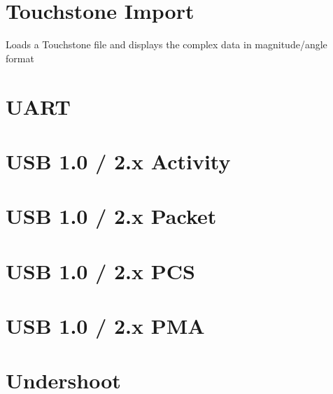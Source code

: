 \pagebreak
\section{Touchstone Import}

Loads a Touchstone file and displays the complex data in magnitude/angle format

\pagebreak
\section{UART}

\pagebreak
\section{USB 1.0 / 2.x Activity}

\pagebreak
\section{USB 1.0 / 2.x Packet}

\pagebreak
\section{USB 1.0 / 2.x PCS}

\pagebreak
\section{USB 1.0 / 2.x PMA}

\pagebreak
\section{Undershoot}

